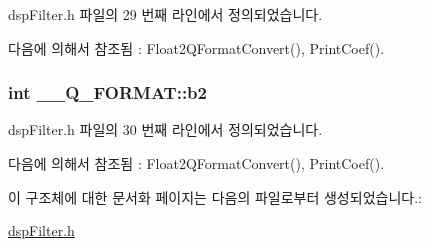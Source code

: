 dsp\+Filter.\+h 파일의 29 번째 라인에서 정의되었습니다.



다음에 의해서 참조됨 \+:  Float2\+Q\+Format\+Convert(), Print\+Coef().

\hypertarget{struct_____q___f_o_r_m_a_t_aea8cafcb12a82b3f125480d1c0ac0d97}{
\subsubsection[{b2}]{\setlength{\rightskip}{0pt plus 5cm}int \+\_\+\+\_\+\+Q\+\_\+\+F\+O\+R\+M\+A\+T\+::b2}}\label{struct_____q___f_o_r_m_a_t_aea8cafcb12a82b3f125480d1c0ac0d97}


dsp\+Filter.\+h 파일의 30 번째 라인에서 정의되었습니다.



다음에 의해서 참조됨 \+:  Float2\+Q\+Format\+Convert(), Print\+Coef().



이 구조체에 대한 문서화 페이지는 다음의 파일로부터 생성되었습니다.\+:\begin{DoxyCompactItemize}
\item 
\hyperlink{dsp_filter_8h}{dsp\+Filter.\+h}\end{DoxyCompactItemize}
